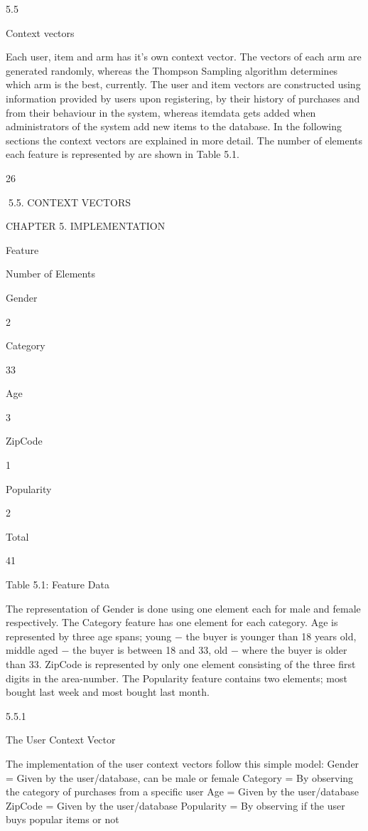 5.5

Context vectors

Each user, item and arm has it’s own context vector. The vectors of each arm are generated randomly, whereas the Thompson Sampling algorithm determines which arm is the
best, currently. The user and item vectors are constructed using information provided
by users upon registering, by their history of purchases and from their behaviour in the
system, whereas itemdata gets added when administrators of the system add new items
to the database.
In the following sections the context vectors are explained in more detail. The number of elements each feature is represented by are shown in Table 5.1.

26

5.5. CONTEXT VECTORS

CHAPTER 5. IMPLEMENTATION

Feature

Number of Elements

Gender

2

Category

33

Age

3

ZipCode

1

Popularity

2

Total

41

Table 5.1: Feature Data

The representation of Gender is done using one element each for male and female respectively. The Category feature has one element for each category. Age is represented
by three age spans; young − the buyer is younger than 18 years old, middle aged −
the buyer is between 18 and 33, old − where the buyer is older than 33. ZipCode is
represented by only one element consisting of the three first digits in the area-number.
The Popularity feature contains two elements; most bought last week and most bought
last month.

5.5.1

The User Context Vector

The implementation of the user context vectors follow this simple model:
Gender = Given by the user/database, can be male or female
Category = By observing the category of purchases from a specific user
Age = Given by the user/database
ZipCode = Given by the user/database
Popularity = By observing if the user buys popular items or not

